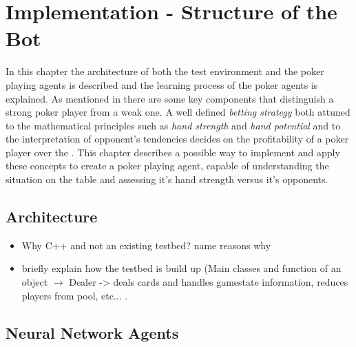 

\chapter{Implementation - Structure of the Bot}
\label{cha:implementation}
In this chapter the architecture of both the test environment and the poker playing agents is described and the learning process of the poker agents is explained. As mentioned in  there are some key components that distinguish a strong poker player from a weak one. A well defined \textit{betting strategy} both attuned to the mathematical principles such as \textit{hand strength} and \textit{hand potential} and to the interpretation of opponent's tendencies decides on the profitability of a poker player over the  \cite{opp_modeling}. This chapter describes a possible way to implement and apply these concepts to create a poker playing agent, capable of understanding the situation on the table and assessing it's hand strength versus it's opponents. 

\section{Architecture }
\begin{itemize}
\item Why C++ and not an existing testbed?
\subitem name reasons why
\item briefly explain how the testbed is build up (Main classes and function of an object $\rightarrow$ Dealer -> deals cards and handles gamestate information, reduces players from pool, etc... .
\end{itemize}
\section{Neural Network Agents}
